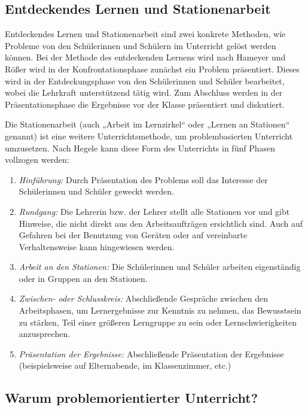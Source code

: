 \documentclass[jour,12pt,a4paper]{apa6}
\begin{document}
\subsection{Entdeckendes Lernen und Stationenarbeit}

Entdeckendes Lernen und Stationenarbeit sind zwei konkrete Methoden, wie Probleme von den Schülerinnen und Schülern im Unterricht gelöst werden können\cite{kunter2013}. Bei der Methode des entdeckenden Lernens wird nach Hameyer und Rößer \cite{hameyer2008} wird in der Konfrontationsphase zunächst ein Problem präsentiert. Dieses wird in der Entdeckungsphase von den Schülerinnen und Schüler bearbeitet, wobei die Lehrkraft unterstützend tätig wird. Zum Abschluss werden in der Präsentationsphase die Ergebnisse vor der Klasse präsentiert und diskutiert.

Die Stationenarbeit (auch „Arbeit im Lernzirkel“ oder „Lernen an Stationen“ genannt) ist eine weitere Unterrichtsmethode, um problembasierten Unterricht umzusetzen\cite{hegele2008}. Nach Hegele \cite{hegele2008} kann diese Form des Unterrichts in fünf Phasen vollzogen werden:

\begin{enumerate}
  \item \emph{Hinführung:} Durch Präsentation des Problems soll das Interesse der Schülerinnen und Schüler geweckt werden.
  \item \emph{Rundgang:} Die Lehrerin bzw. der Lehrer stellt alle Stationen vor und gibt Hinweise, die nicht direkt aus den Arbeitsaufträgen ersichtlich sind. Auch auf Gefahren bei der Benutzung von Geräten oder auf vereinbarte Verhaltensweise kann hingewiesen werden.
  \item \emph{Arbeit an den Stationen:} Die Schülerinnen und Schüler arbeiten eigenständig oder in Gruppen an den Stationen.
  \item \emph{Zwischen- oder Schlusskreis:} Abschließende Gespräche zwischen den Arbeitsphasen, um Lernergebnisse zur Kenntnis zu nehmen, das Bewusstsein zu stärken, Teil einer größeren Lerngruppe zu sein oder Lernschwierigkeiten anzusprechen.
  \item \emph{Präsentation der Ergebnisse:} Abschließende Präsentation der Ergebnisse (beispielsweise auf Elternabende, im Klassenzimmer, etc.)
\end{enumerate}

\subsection{Warum problemorientierter Unterricht?}
\end{document}
